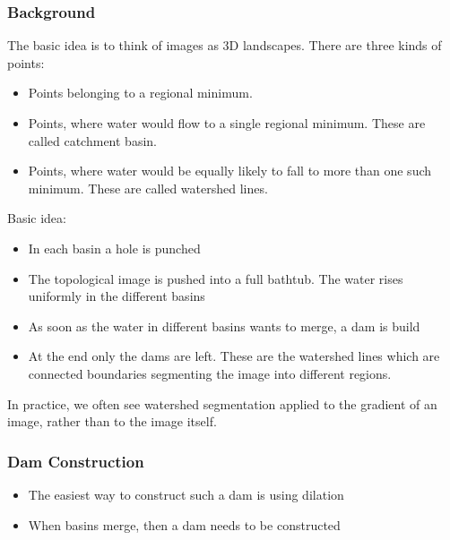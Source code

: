 \subsubsection{Background}
The basic idea is to think of images as 3D landscapes. There are three kinds of points:
\begin{itemize}
\item Points belonging to a regional minimum.
\item Points, where water would flow to a single regional minimum. These are called catchment basin.
\item Points, where water would be equally likely to fall to more than one such minimum. These are called watershed lines.
\end{itemize}
Basic idea:
\begin{itemize}
\item In each basin a hole is punched
\item The topological image is pushed into a full bathtub. The water rises uniformly in the different basins
\item As soon as the water in different basins wants to merge, a dam is build
\item At the end only the dams are left. These are the watershed lines which are connected boundaries segmenting the image into different regions.
\end{itemize}
In practice, we often see watershed segmentation applied to the gradient of an image, rather than to the image itself.
\subsubsection{Dam Construction}
\begin{itemize}
\item The easiest way to construct such a dam is using dilation
\item When basins merge, then a dam needs to be constructed
\end{itemize}
